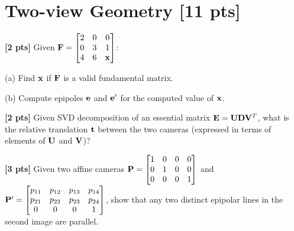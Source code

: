 \section{Two-view Geometry  [11 pts]}
\begin{questions}

    \question \textbf{[2 pts]} Given $\mathbf{F} = \begin{bmatrix}
            2 & 0 & 0   \\
            0 & 3 & 1   \\
            4 & 6 & \mathbf{x}
        \end{bmatrix}$:

    (a) Find $\mathbf{x}$ if $\mathbf{F}$ is a valid fundamental matrix.

    \begin{tcolorbox}[fit,height=4.5cm, width=\textwidth, blank, borderline={0.5pt}{-2pt},halign=left, valign=center, nobeforeafter]
    \end{tcolorbox}

    (b) Compute epipoles $\mathbf{e}$ and $\mathbf{e}'$ for the computed value of $\mathbf{x}$.

    \begin{tcolorbox}[fit,height=4.5cm, width=\textwidth, blank, borderline={0.5pt}{-2pt},halign=left, valign=center, nobeforeafter]
    \end{tcolorbox}

    \question \textbf{[2 pts]} Given SVD decomposition of an essential matrix $\mathbf{E} = \mathbf{U}\mathbf{D}\mathbf{V}^T$, what is the relative translation $\mathbf{t}$ between the two cameras (expressed in terms of elements of $\mathbf{U}$  and $\mathbf{V}$)?

    \begin{tcolorbox}[fit,height=4.5cm, width=\textwidth, blank, borderline={0.5pt}{-2pt},halign=left, valign=center, nobeforeafter]


    \end{tcolorbox}
    \clearpage

    \question \textbf{[3 pts]} Given two affine cameras $\mathbf{P} = \begin{bmatrix}
            1 & 0 & 0 & 0 \\
            0 & 1 & 0 & 0 \\
            0 & 0 & 0 & 1
        \end{bmatrix}$ and $\mathbf{P}' = \begin{bmatrix}
            p_{11} & p_{12} & p_{13} & p_{14} \\
            p_{21} & p_{22} & p_{23} & p_{24} \\
            0      & 0      & 0      & 1
        \end{bmatrix}$, show that any two distinct epipolar lines in the second image are parallel.


\end{questions}
